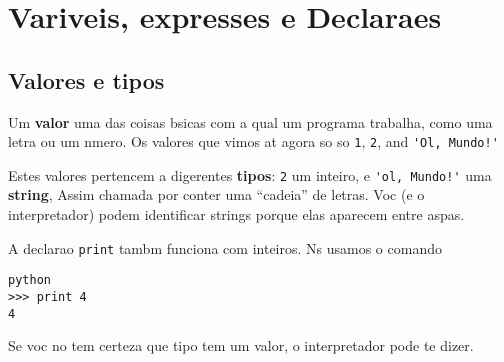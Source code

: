 
\chapter{Vari veis, express es e Declara  es}
\section{Valores e tipos}

Um {\bf valor}   uma das coisas b sicas com a qual um programa trabalha, como uma letra ou um n mero.
Os valores que vimos at  agora s o
s o {\tt 1}, {\tt 2}, and
\verb"'Ol , Mundo!'"

Estes valores pertencem a digerentes {\bf tipos}:
{\tt 2}   um inteiro, e \verb"'ol , Mundo!'"   uma {\bf string},
Assim chamada por conter uma ``cadeia'' de letras.
Voc  (e o interpretador) podem identificar strings 
porque elas aparecem entre aspas.


A declara  o {\tt print} tamb m funciona com inteiros. N s usamos o 
comando %

\beforeverb
\begin{verbatim}
python
>>> print 4
4
\end{verbatim}
\afterverb
%
Se voc  n o tem certeza que tipo tem um valor, o interpretador pode te dizer.

